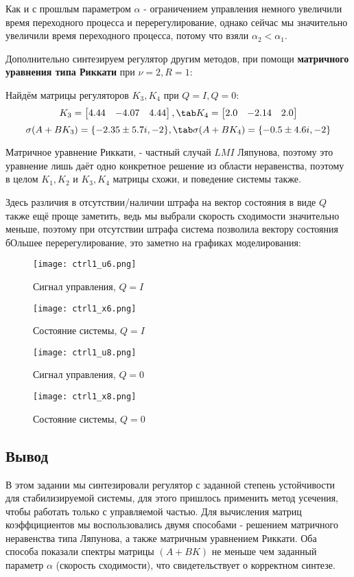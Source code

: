 Как и с прошлым параметром $\alpha$ - ограничением управления немного увеличили время переходного процесса и перерегулирование, 
однако сейчас мы значительно увеличили время переходного процесса, потому что взяли $\alpha_2 < \alpha_1$.

Дополнительно синтезируем регулятор другим методов, при помощи \textbf{матричного уравнения типа Риккати} при $\nu=2, R=1$:

Найдём матрицы регуляторов $K_3, K_4$ при $Q = I, Q = 0$:
$$
  K_3 = \begin{bmatrix}
    4.44 &  -4.07 & 4.44
    \end{bmatrix}, \tab
  K_4 = \begin{bmatrix}
   2.0 & -2.14 & 2.0
  \end{bmatrix}
$$
$$
  \sigma(A+BK_3)=\{ -2.35 \pm 5.7i, -2 \}, \tab \sigma(A+BK_4)=\{ -0.5 \pm 4.6i, -2 \}
$$

Матричное уравнение Риккати, - частный случай $LMI$ Ляпунова, поэтому это уравнение лишь даёт одно конкретное решение из области неравенства,
поэтому в целом $K_1, K_2$ и $K_3, K_4$ матрицы схожи, и поведение системы также. 

Здесь различия в отсутствии/наличии штрафа на вектор состояния в виде $Q$ также ещё проще заметить, ведь мы выбрали скорость сходимости значительно меньше,
поэтому при отсутствии штрафа система позволила вектору состояния бОльшее перерегулирование, это заметно на графиках моделирования:

\begin{figure}[ht]
  \centering
  \texttt{[image: ctrl1\_u6.png]}
  \caption{Сигнал управления, $Q=I$}
\end{figure}
\newpage
\begin{figure}[ht]
  \centering
  \texttt{[image: ctrl1\_x6.png]}
  \caption{Состояние системы, $Q=I$}
\end{figure}
\begin{figure}[ht]
  \centering
  \texttt{[image: ctrl1\_u8.png]}
  \caption{Сигнал управления, $Q=0$}
\end{figure}
\newpage
\begin{figure}[ht]
  \centering
  \texttt{[image: ctrl1\_x8.png]}
  \caption{Состояние системы, $Q=0$}
\end{figure}

\subsection{Вывод}

В этом задании мы синтезировали регулятор с заданной степень устойчивости для стабилизируемой системы, для этого пришлось применить метод усечения, чтобы работать только с управляемой частью.
Для вычисления матриц коэффцициентов мы воспользовались двумя способами - решением матричного неравенства типа Ляпунова, а также матричным уравнением Риккати. 
Оба способа показали спектры матрицы $(A+BK)$ не меньше чем заданный параметр $\alpha$ (скорость сходимости), что свидетельствует о корректном синтезе.

\endinput